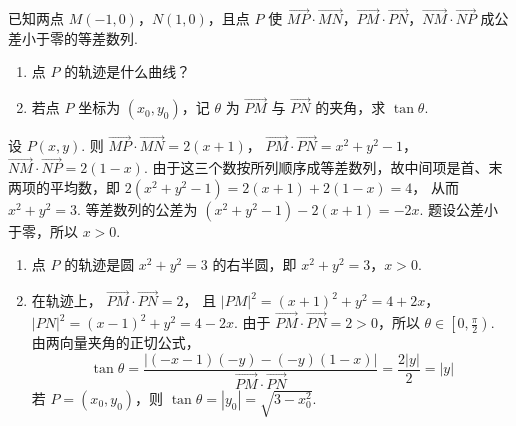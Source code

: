 \begin{problem}
已知两点 \(M(-1,0)\)，\(N(1,0)\)，且点 \(P\) 使 \(\overrightarrow{MP} \cdot \overrightarrow{MN}\)，\(\overrightarrow{PM} \cdot \overrightarrow{PN}\)，\(\overrightarrow{NM} \cdot \overrightarrow{NP}\) 成公差小于零的等差数列.

\begin{enumerate}
\item 点 \(P\) 的轨迹是什么曲线？
\item 若点 \(P\) 坐标为 \((x_0, y_0)\)，记 \(\theta\) 为 \(\overrightarrow{PM}\) 与 \(\overrightarrow{PN}\) 的夹角，求 \(\tan \theta\).
\end{enumerate}
\end{problem}

\begin{solution}
设 \(P(x,y)\). 则
\(\overrightarrow{MP}\cdot\overrightarrow{MN}=2(x+1)\)，
\(\overrightarrow{PM}\cdot\overrightarrow{PN}=x^2+y^2-1\)，
\(\overrightarrow{NM}\cdot\overrightarrow{NP}=2(1-x)\).
由于这三个数按所列顺序成等差数列，故中间项是首、末两项的平均数，即
\(2(x^2+y^2-1)=2(x+1)+2(1-x)=4\)，
从而 \(x^2+y^2=3\). 等差数列的公差为
\((x^2+y^2-1)-2(x+1)=-2x\).
题设公差小于零，所以 \(x>0\).
\begin{enumerate}
\item 点 \(P\) 的轨迹是圆 \(x^2+y^2=3\) 的右半圆，即 \(x^2+y^2=3\)，\(x>0\).
\item 在轨迹上，
\(\overrightarrow{PM}\cdot\overrightarrow{PN}=2\)，
且 \(|PM|^2=(x+1)^2+y^2=4+2x\)，\(|PN|^2=(x-1)^2+y^2=4-2x\).
由于 \(\overrightarrow{PM}\cdot\overrightarrow{PN}=2>0\)，所以 \(\theta\in\left[0,\frac{\pi}{2}\right)\). 由两向量夹角的正切公式，
\[
\tan\theta=\frac{\left|(-x-1)(-y)-(-y)(1-x)\right|}{\overrightarrow{PM}\cdot\overrightarrow{PN}}=\frac{2|y|}{2}=|y|
\]
若 \(P=(x_0,y_0)\)，则
\(\tan\theta=|y_0|=\sqrt{3-x_0^2}\).
\end{enumerate}
\end{solution}
